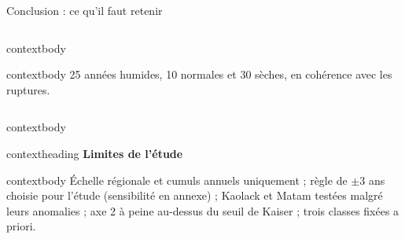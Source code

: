 \documentclass[aspectratio=169,11pt]{beamer}
\begin{document}
\begin{frame}{Conclusion : ce qu’il faut retenir}
\begin{columns}[T,onlytextwidth]
\begin{beamercolorbox}[wd=\linewidth,rounded=true,sep=0pt]{contextbody}
        \par\vspace{0.22cm}
        \begin{beamercolorbox}[wd=\linewidth,sep=0.14cm]{contextbody}
          \small
          \vspace*{0.22cm}
          \linespread{1.08}\selectfont
          \textcolor{marine}{25 années humides, 10 normales et 30 sèches}, en cohérence avec les ruptures.\par\vspace{0.40cm}
        \end{beamercolorbox}
      \end{beamercolorbox}
  \end{columns}
  \vspace{0.35cm}
  \begin{beamercolorbox}[wd=\textwidth,rounded=true,sep=0pt]{contextbody}
    \begin{beamercolorbox}[wd=\linewidth,ht=0.40cm,dp=0.08cm,leftskip=0.14cm]{contextheading}
      \bfseries Limites de l’étude
    \end{beamercolorbox}
    \begin{beamercolorbox}[wd=\linewidth,sep=0.12cm]{contextbody}
      \footnotesize
      Échelle régionale et cumuls annuels uniquement ; règle de $\pm 3$ ans choisie pour l’étude (sensibilité en annexe) ; Kaolack et Matam testées malgré leurs anomalies ; axe 2 à peine au-dessus du seuil de Kaiser ; trois classes fixées a priori.
    \end{beamercolorbox}
  \end{beamercolorbox}
\end{frame}
\end{document}
